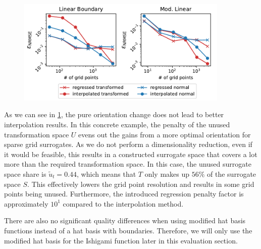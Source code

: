 \documentclass[
  a4paper,  %
  twoside,  %
  bibliography=totoc,
  headsepline,
  cleardoublepage=empty,
  parskip=half,
  draft=false
]{scrbook}
\begin{document}
\begin{mdframed}[style=style]
\vspace{-3mm}
\begin{figure}[H]
\centering
\includegraphics[width=0.9\textwidth]{graphics/ishigami_orientation}\vspace{-4mm}
\delimit
{}
\label{fig:ishigami_errors}
\end{figure}
\end{mdframed}
%
As we can see in \cref{fig:ishigami_errors}, the pure orientation change does not lead to better interpolation results.
In this concrete example, the penalty of the unused transformation space $U$ evens out the gains from a more optimal orientation for sparse grid surrogates.
As we do not perform a dimensionality reduction, even if it would be feasible, this results in a constructed surrogate space that covers a lot more than the required transformation space.
In this case, the unused surrogate space share is $\tilde{u}_t=0.44$, which means that $T$ only makes up $56\%$ of the surrogate space $S$.
This effectively lowers the grid point resolution and results in some grid points being unused.
Furthermore, the introduced regression penalty factor is approximately $10^1$ compared to the interpolation method.

There are also no significant quality differences when using modified hat basis functions instead of a hat basis with boundaries.
Therefore, we will only use the modified hat basis for the Ishigami function later in this evaluation section.
\end{document}
